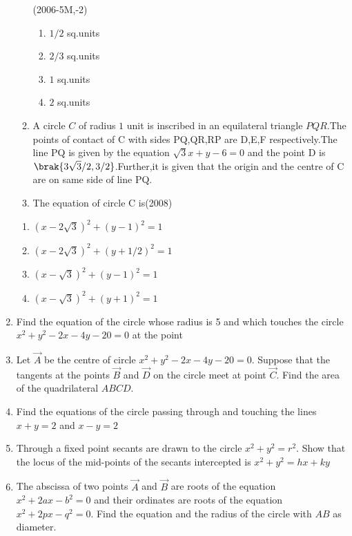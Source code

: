 \begin{enumerate}
\begin{enumerate}
\hfill(2006-5M,-2)
\begin{enumerate}
\item $1/2$ sq.units
\item $2/3$ sq.units
\item $1$ sq.units
\item $2$ sq.units
\end{enumerate}

\item A circle $C$ of radius $1$ unit is inscribed in an equilateral triangle $PQR$.The points of contact of C with sides PQ,QR,RP are D,E,F respectively.The line PQ is given by the equation $\sqrt{3}x+y-6=0$ and the point D is $\brak{3\sqrt{3}/2 , 3/2}$.Further,it is given that the origin and the centre of C are on same side of line PQ.\\

\item The equation of circle C is\hfill(2008)
\end{enumerate}
\begin{enumerate}
\item $(x-2\sqrt{3})^2 + (y-1)^2=1$
\item $(x-2\sqrt{3})^2 + (y+1/2)^2=1$
\item $(x-\sqrt{3})^2 + (y-1)^2=1$
\item $(x-\sqrt{3})^2 + (y+1)^2=1$
\end{enumerate}
\item Find the equation of the circle whose radius is 5 and which touches the circle $x^2+y^2-2x-4y-20=0$ at the point 

\hfill {}
\item Let $\vec{A}$ be the centre of circle $x^2+y^2-2x-4y-20=0$. Suppose that the tangents at the points $\vec{B}$ and $\vec{D}$ on the circle meet at point $\vec{C}$. Find the area of the quadrilateral $ABCD$.

\hfill {}
\item Find the equations of the circle passing through  and touching the lines $x+y=2$ and $x-y=2$

\hfill {}
\item Through a fixed point  secants are drawn to the circle $x^2+y^2=r^2$. Show that the locus of the mid-points of the secants intercepted is $x^2+y^2=hx+ky$

\hfill {}
\item The abscissa of two points $\vec{A}$ and $\vec{B}$ are roots of the equation $x^2+2ax-b^2=0$ and their ordinates are roots of the equation $x^2+2px-q^2=0$. Find the equation and the radius of the circle with $AB$ as diameter.


\end{enumerate}
